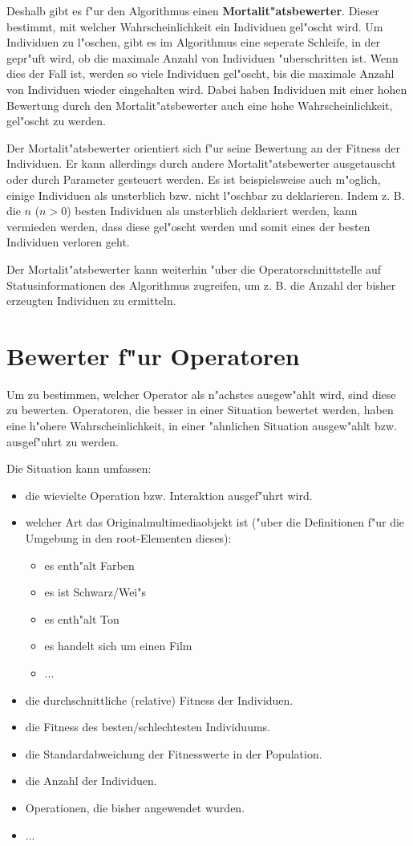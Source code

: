 Deshalb gibt es f"ur den Algorithmus einen \textbf{Mortalit"atsbewerter}. Dieser bestimmt, mit welcher Wahrscheinlichkeit ein Individuen gel"oscht wird. Um Individuen zu l"oschen, gibt es im Algorithmus eine seperate Schleife, in der gepr"uft wird, ob die maximale Anzahl von Individuen "uberschritten ist. Wenn dies der Fall ist, werden so viele Individuen gel"oscht, bis die maximale Anzahl von Individuen wieder eingehalten wird. Dabei haben Individuen mit einer hohen Bewertung durch den Mortalit"atsbewerter auch eine hohe Wahrscheinlichkeit, gel"oscht zu werden.

Der Mortalit"atsbewerter orientiert sich f"ur seine Bewertung an der Fitness der Individuen. Er kann allerdings durch andere Mortalit"atsbewerter ausgetauscht oder durch Parameter gesteuert werden. Es ist beispielsweise auch m"oglich, einige Individuen als unsterblich bzw. nicht l"oschbar zu deklarieren. Indem z. B. die $n$ ($n>0$) besten Individuen als unsterblich deklariert werden, kann vermieden werden, dass diese gel"oscht werden und somit eines der besten Individuen verloren geht.

Der Mortalit"atsbewerter kann weiterhin "uber die Operatorschnittstelle auf Statusinformationen des Algorithmus zugreifen, um z. B. die Anzahl der bisher erzeugten Individuen zu ermitteln.


\section{Bewerter f"ur Operatoren}

Um zu bestimmen, welcher Operator als n"achstes ausgew"ahlt wird, sind diese zu bewerten. Operatoren, die besser in einer Situation bewertet werden, haben eine h"ohere Wahrscheinlichkeit, in einer "ahnlichen Situation ausgew"ahlt bzw. ausgef"uhrt zu werden.

\bigskip\noindent
Die Situation kann umfassen:
\begin{itemize}
 \item die wievielte Operation bzw. Interaktion ausgef"uhrt wird.
 \item welcher Art das Originalmultimediaobjekt ist ("uber die Definitionen f"ur die Umgebung in den root-Elementen dieses):
 \begin{itemize}
  \item es enth"alt Farben 
  \item es ist Schwarz/Wei"s
  \item es enth"alt Ton
  \item es handelt sich um einen Film
  \item ...
 \end{itemize}
 \item die durchschnittliche (relative) Fitness der Individuen.
 \item die Fitness des besten/schlechtesten Individuums.
 \item die Standardabweichung der Fitnesswerte in der Population.
 \item die Anzahl der Individuen.
 \item Operationen, die bisher angewendet wurden.
 \item ...
\end{itemize}

